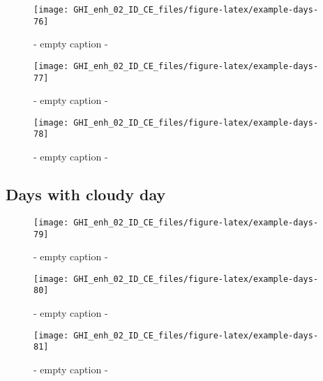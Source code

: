 \documentclass[
  10pt,
  a4paper,oneside]{article}
\begin{document}
\begin{figure}[H]

{\centering \texttt{[image: GHI\_enh\_02\_ID\_CE\_files/figure-latex/example-days-76]} 

}

\caption{ - empty caption - }\label{fig:example-days-76}
\end{figure}

\begin{figure}[H]

{\centering \texttt{[image: GHI\_enh\_02\_ID\_CE\_files/figure-latex/example-days-77]} 

}

\caption{ - empty caption - }\label{fig:example-days-77}
\end{figure}

\begin{figure}[H]

{\centering \texttt{[image: GHI\_enh\_02\_ID\_CE\_files/figure-latex/example-days-78]} 

}

\caption{ - empty caption - }\label{fig:example-days-78}
\end{figure}

\FloatBarrier

\hypertarget{days-with-cloudy-day}{%
\subsection{Days with cloudy day}\label{days-with-cloudy-day}}

\begin{figure}[H]

{\centering \texttt{[image: GHI\_enh\_02\_ID\_CE\_files/figure-latex/example-days-79]} 

}

\caption{ - empty caption - }\label{fig:example-days-79}
\end{figure}

\begin{figure}[H]

{\centering \texttt{[image: GHI\_enh\_02\_ID\_CE\_files/figure-latex/example-days-80]} 

}

\caption{ - empty caption - }\label{fig:example-days-80}
\end{figure}

\begin{figure}[H]

{\centering \texttt{[image: GHI\_enh\_02\_ID\_CE\_files/figure-latex/example-days-81]} 

}

\caption{ - empty caption - }\label{fig:example-days-81}
\end{figure}
\end{document}
